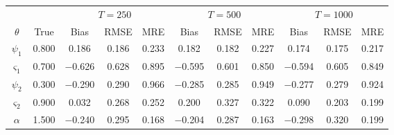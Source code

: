 \begin{tabular}{ccccccccccc}
\toprule
 &  & \multicolumn{3}{c}{$T = 250$} & \multicolumn{3}{c}{$T = 500$} & \multicolumn{3}{c}{$T = 1000$} \\
\cmidrule(lr){3-5} \cmidrule(lr){6-8} \cmidrule(lr){9-11}
$\theta$ & True & Bias & RMSE & MRE & Bias & RMSE & MRE & Bias & RMSE & MRE \\
\midrule
$\psi_1$ & 0.800 & 0.186 & 0.186 & 0.233 & 0.182 & 0.182 & 0.227 & 0.174 & 0.175 & 0.217 \\
$\varsigma_1$ & 0.700 & $-$0.626 & 0.628 & 0.895 & $-$0.595 & 0.601 & 0.850 & $-$0.594 & 0.605 & 0.849 \\
$\psi_2$ & 0.300 & $-$0.290 & 0.290 & 0.966 & $-$0.285 & 0.285 & 0.949 & $-$0.277 & 0.279 & 0.924 \\
$\varsigma_2$ & 0.900 & 0.032 & 0.268 & 0.252 & 0.200 & 0.327 & 0.322 & 0.090 & 0.203 & 0.199 \\
$\alpha$ & 1.500 & $-$0.240 & 0.295 & 0.168 & $-$0.204 & 0.287 & 0.163 & $-$0.298 & 0.320 & 0.199 \\
\bottomrule
\end{tabular}